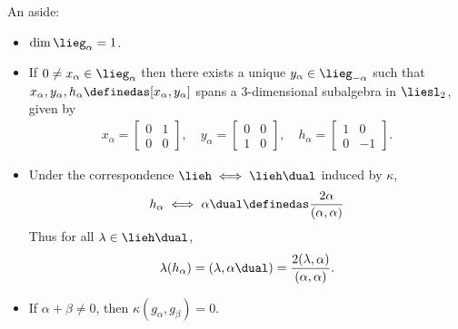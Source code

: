 \begin{remark}

\label{rmk:aside1} An aside:

\begin{itemize}
\item
  \(\dim \lieg_\alpha = 1\).
\item
  If \(0 \neq x_\alpha \in \lieg_\alpha\) then there exists a unique
  \(y_\alpha \in \lieg_{-\alpha}\) such that
  \(x_\alpha, y_\alpha, h_\alpha \definedas [x_\alpha, y_\alpha]\) spans
  a 3-dimensional subalgebra in \(\liesl_2\), given by
  \begin{align*}
  x_\alpha = 
  \begin{bmatrix}
  0 & 1 \\
  0 & 0
  \end{bmatrix}, 
  \quad
  y_\alpha = 
  \begin{bmatrix}
  0 & 0 \\
  1 & 0
  \end{bmatrix},
  \quad
  h_\alpha =\begin{bmatrix}
  1 & 0 \\
  0 & -1
  \end{bmatrix}
  .\end{align*}
\item
  Under the correspondence \(\lieh \iff \lieh\dual\) induced by
  \(\kappa\),
  \begin{align*}
  h_\alpha \iff \alpha\dual \definedas \frac{2\alpha}{(\alpha, \alpha)}
  \end{align*} Thus for all \(\lambda \in\lieh\dual\),
  \begin{align*}
  \lambda(h_\alpha) = (\lambda, \alpha\dual) = \frac{2(\lambda, \alpha)}{(\alpha, \alpha)}
  .\end{align*}
\item
  If \(\alpha + \beta \neq 0\), then \(\kappa(g_\alpha, g_\beta) = 0\).
\end{itemize}

\end{remark}

